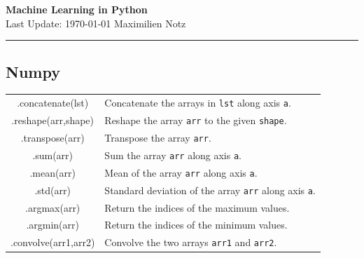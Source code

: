 \documentclass[5pt]{article}
\begin{document}
\begin{center}
     \Large{\textbf{Machine Learning in Python}}\\
     \small{Last Update: \today}\hfill\small{ Maximilien Notz}
     \noindent\rule{20.2cm}{0.4pt}
\end{center}


\begin{multicols}{2}
\setcounter{secnumdepth}{0}

\subsection{Numpy}
\begin{tabular}{C L}
.concatenate(lst)        & Concatenate the arrays in \texttt{lst} along axis \texttt{a}.\\
.reshape(arr,shape)      & Reshape the array \texttt{arr} to the given \texttt{shape}.\\
.transpose(arr)          & Transpose the array \texttt{arr}.\\
.sum(arr)                & Sum the array \texttt{arr} along axis \texttt{a}.\\
.mean(arr)               & Mean of the array \texttt{arr} along axis \texttt{a}.\\
.std(arr)                & Standard deviation of the array \texttt{arr} along axis \texttt{a}.\\
.argmax(arr)             & Return the indices of the maximum values.\\
.argmin(arr)             & Return the indices of the minimum values.\\
.convolve(arr1,arr2)     & Convolve the two arrays \texttt{arr1} and \texttt{arr2}.\\
\end{tabular}


\end{multicols}
\end{document}
